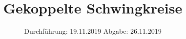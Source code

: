 

\subject{V355}
\title{Gekoppelte Schwingkreise}
\date{%
  Durchführung: 19.11.2019
  \hspace{3em}
  Abgabe: 26.11.2019
}



\maketitle
\thispagestyle{empty}
\tableofcontents
\newpage







\printbibliography{}



